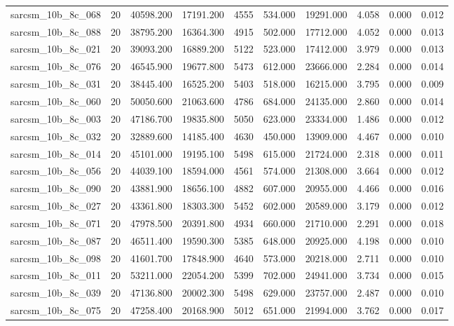 \begin{tabular}{lrrrrrrrrr}
sarcsm\_10b\_8c\_068 & 20 & 40598.200 & 17191.200 & 4555 & 534.000 & 19291.000 & 4.058 & 0.000 & 0.012 \\
sarcsm\_10b\_8c\_088 & 20 & 38795.200 & 16364.300 & 4915 & 502.000 & 17712.000 & 4.052 & 0.000 & 0.013 \\
sarcsm\_10b\_8c\_021 & 20 & 39093.200 & 16889.200 & 5122 & 523.000 & 17412.000 & 3.979 & 0.000 & 0.013 \\
sarcsm\_10b\_8c\_076 & 20 & 46545.900 & 19677.800 & 5473 & 612.000 & 23666.000 & 2.284 & 0.000 & 0.014 \\
sarcsm\_10b\_8c\_031 & 20 & 38445.400 & 16525.200 & 5403 & 518.000 & 16215.000 & 3.795 & 0.000 & 0.009 \\
sarcsm\_10b\_8c\_060 & 20 & 50050.600 & 21063.600 & 4786 & 684.000 & 24135.000 & 2.860 & 0.000 & 0.014 \\
sarcsm\_10b\_8c\_003 & 20 & 47186.700 & 19835.800 & 5050 & 623.000 & 23334.000 & 1.486 & 0.000 & 0.012 \\
sarcsm\_10b\_8c\_032 & 20 & 32889.600 & 14185.400 & 4630 & 450.000 & 13909.000 & 4.467 & 0.000 & 0.010 \\
sarcsm\_10b\_8c\_014 & 20 & 45101.000 & 19195.100 & 5498 & 615.000 & 21724.000 & 2.318 & 0.000 & 0.011 \\
sarcsm\_10b\_8c\_056 & 20 & 44039.100 & 18594.000 & 4561 & 574.000 & 21308.000 & 3.664 & 0.000 & 0.012 \\
sarcsm\_10b\_8c\_090 & 20 & 43881.900 & 18656.100 & 4882 & 607.000 & 20955.000 & 4.466 & 0.000 & 0.016 \\
sarcsm\_10b\_8c\_027 & 20 & 43361.800 & 18303.300 & 5452 & 602.000 & 20589.000 & 3.179 & 0.000 & 0.012 \\
sarcsm\_10b\_8c\_071 & 20 & 47978.500 & 20391.800 & 4934 & 660.000 & 21710.000 & 2.291 & 0.000 & 0.018 \\
sarcsm\_10b\_8c\_087 & 20 & 46511.400 & 19590.300 & 5385 & 648.000 & 20925.000 & 4.198 & 0.000 & 0.010 \\
sarcsm\_10b\_8c\_098 & 20 & 41601.700 & 17848.900 & 4640 & 573.000 & 20218.000 & 2.711 & 0.000 & 0.010 \\
sarcsm\_10b\_8c\_011 & 20 & 53211.000 & 22054.200 & 5399 & 702.000 & 24941.000 & 3.734 & 0.000 & 0.015 \\
sarcsm\_10b\_8c\_039 & 20 & 47136.800 & 20002.300 & 5498 & 629.000 & 23757.000 & 2.487 & 0.000 & 0.010 \\
sarcsm\_10b\_8c\_075 & 20 & 47258.400 & 20168.900 & 5012 & 651.000 & 21994.000 & 3.762 & 0.000 & 0.017 \\

\end{tabular}
